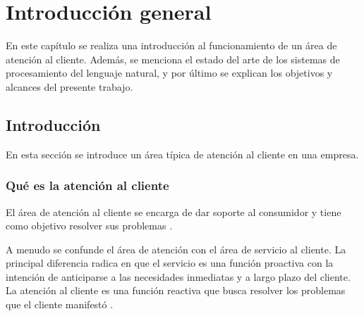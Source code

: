 
\chapter{Introducción general} %

\label{Chapter1} %
\label{IntroGeneral}


\newcommand{\keyword}[1]{\textbf{#1}}
\newcommand{\tabhead}[1]{\textbf{#1}}
\newcommand{\code}[1]{\texttt{#1}}
\newcommand{\file}[1]{\texttt{\bfseries#1}}
\newcommand{\option}[1]{\texttt{\itshape#1}}
\newcommand{\grados}{$^{\circ}$}


En este capítulo se realiza una introducción al funcionamiento de un área de atención al cliente. Además, se menciona el estado del arte de los sistemas de procesamiento del lenguaje natural, y por último se explican los objetivos y alcances del presente trabajo.

\section{Introducción}

En esta sección se introduce un área típica de atención al cliente en una empresa.

\subsection{Qué es la atención al cliente}

El área de atención al cliente se encarga de dar soporte al consumidor y tiene como objetivo resolver sus problemas \citep{WEBSITE:1}.

A menudo se confunde el área de atención con el área de servicio al cliente. La principal diferencia radica en que el servicio es una función proactiva con la intención de anticiparse a las necesidades inmediatas y a largo plazo del cliente. La atención al cliente es una función reactiva que busca resolver los problemas que el cliente manifestó \citep{WEBSITE:3}.

